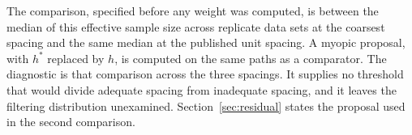 The comparison, specified before any weight was computed, is between the median of this effective sample size across replicate data sets at the coarsest spacing and the same median at the published unit spacing. A myopic proposal, with \(h^{*}\) replaced by \(h\), is computed on the same paths as a comparator. The diagnostic is that comparison across the three spacings. It supplies no threshold that would divide adequate spacing from inadequate spacing, and it leaves the filtering distribution unexamined. Section~\ref{sec:residual} states the proposal used in the second comparison.
